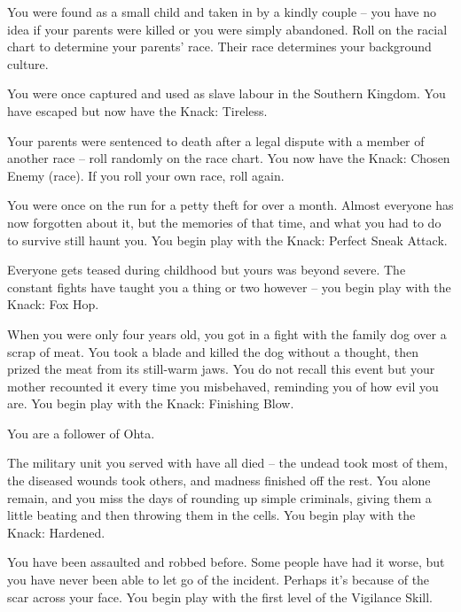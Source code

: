\begin{multicols}{2}
\begin{list}{\addtocounter{list}{1}\textbf{:}}{\raggedleft}
	\item
	You were found as a small child and taken in by a kindly couple -- you have no idea if your parents were killed or you were simply abandoned.
	Roll on the racial chart to determine your parents' race.
	Their race determines your background culture.

	\item
	You were once captured and used as slave labour in the Southern Kingdom.
	You have escaped but now have the Knack: Tireless.

	\item
	Your parents were sentenced to death after a legal dispute with a member of another race -- roll randomly on the race chart.
	You now have the Knack: Chosen Enemy (race).
	If you roll your own race, roll again.

	\item
	You were once on the run for a petty theft for over a month.
	Almost everyone has now forgotten about it, but the memories of that time, and what you had to do to survive still haunt you.
	You begin play with the Knack: Perfect Sneak Attack.

\item
Everyone gets teased during childhood but yours was beyond severe.
The constant fights have taught you a thing or two however -- you begin play with the Knack: Fox Hop.

	\item
	When you were only four years old, you got in a fight with the family dog over a scrap of meat.
	You took a blade and killed the dog without a thought, then prized the meat from its still-warm jaws.
	You do not recall this event but your mother recounted it every time you misbehaved, reminding you of how evil you are.
	You begin play with the Knack: Finishing Blow.

	You are a follower of Ohta.

	\item
	The military unit you served with have all died -- the undead took most of them, the diseased wounds took others, and madness finished off the rest.
	You alone remain, and you miss the days of rounding up simple criminals, giving them a little beating and then throwing them in the cells.
	You begin play with the Knack: Hardened.

	\item
	You have been assaulted and robbed before.
	Some people have had it worse, but you have never been able to let go of the incident.
	Perhaps it's because of the scar across your face.
	You begin play with the first level of the Vigilance Skill.


\end{list}
\end{multicols}
